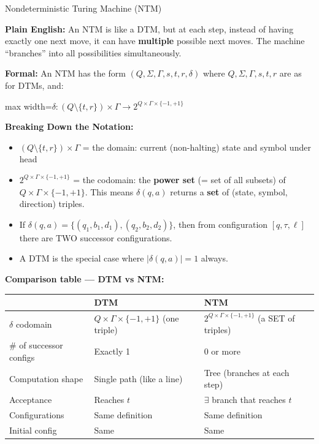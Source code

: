 \documentclass[11pt,a4paper]{article}
\newcommand{\fitmath}[1]{\begin{adjustbox}{max width=\linewidth}$\displaystyle #1$\end{adjustbox}}
\begin{document}
\begin{definitionbox}{Nondeterministic Turing Machine (NTM)}

\textbf{Plain English:} An NTM is like a DTM, but at each step, instead of having exactly one next move, it can have \textbf{multiple} possible next moves. The machine ``branches'' into all possibilities simultaneously.

\textbf{Formal:} An NTM has the form $(Q, \Sigma, \Gamma, s, t, r, \delta)$ where $Q, \Sigma, \Gamma, s, t, r$ are as for DTMs, and:

\fitmath{\delta\colon (Q \setminus \{t, r\}) \times \Gamma \to 2^{Q \times \Gamma \times \{-1, +1\}}}

\textbf{Breaking Down the Notation:}
\begin{itemize}[nosep]
\item $(Q \setminus \{t, r\}) \times \Gamma$ = the domain: current (non-halting) state and symbol under head
\item $2^{Q \times \Gamma \times \{-1, +1\}}$ = the codomain: the \textbf{power set} (= set of all subsets) of $Q \times \Gamma \times \{-1, +1\}$. This means $\delta(q, a)$ returns a \textbf{set} of (state, symbol, direction) triples.
\item If $\delta(q, a) = \{(q_1, b_1, d_1), (q_2, b_2, d_2)\}$, then from configuration $[q, \tau, \ell]$ there are TWO successor configurations.
\item A DTM is the special case where $|\delta(q, a)| = 1$ always.
\end{itemize}

\textbf{Comparison table --- DTM vs NTM:}
\begin{center}
\renewcommand{\arraystretch}{1.3}
\begin{tabular}{lp{5.5cm}p{5.5cm}}
\toprule
& \textbf{DTM} & \textbf{NTM} \\
\midrule
$\delta$ codomain & $Q \times \Gamma \times \{-1,+1\}$ (one triple) & $2^{Q \times \Gamma \times \{-1,+1\}}$ (a SET of triples) \\
\# of successor configs & Exactly 1 & 0 or more \\
Computation shape & Single path (like a line) & Tree (branches at each step) \\
Acceptance & Reaches $t$ & $\exists$ branch that reaches $t$ \\
Configurations & Same definition & Same definition \\
Initial config & Same & Same \\
\bottomrule
\end{tabular}
\end{center}


\end{definitionbox}
\end{document}
